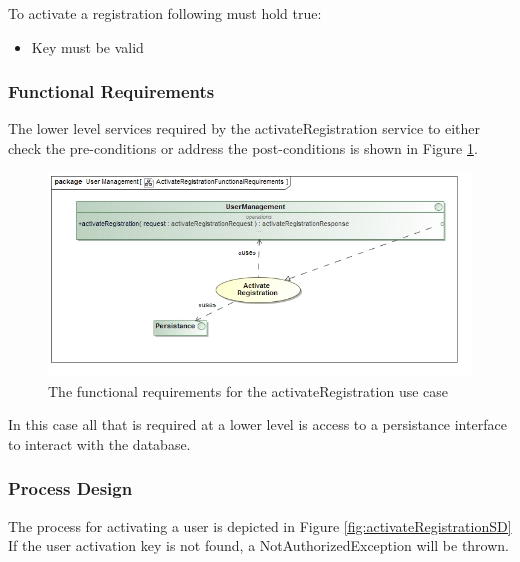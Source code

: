 To activate a registration following must hold true:
\begin{itemize}
	\item Key must be valid
\end{itemize}

\subsubsection{Functional Requirements}
The lower level services required by the activateRegistration service
to either check the pre-conditions or address the post-conditions is shown
in Figure \ref{fig:activateRegFR}.

\begin{figure}[H]
	\begin{center}
		\includegraphics[scale=0.5]{../Diagrams and Charts/Users/ActivateRegistrationFunctionalRequirements.jpg}
		\caption{The functional requirements for the activateRegistration use case}
		\label{fig:activateRegFR}
	\end{center}	
\end{figure}

In this case all that is required at a lower level is access to a persistance
interface to interact with the database.

\subsubsection{Process Design}
The process for activating a user is depicted in Figure \ref{fig:activateRegistrationSD}
If the user activation key is not found, a NotAuthorizedException will be thrown.

